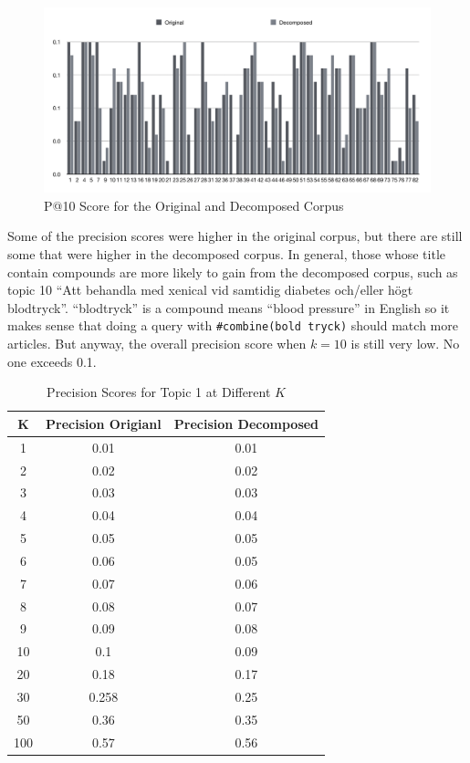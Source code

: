 \documentclass[11pt]{article} %
\begin{document}
\begin{figure}[h]
    \centering
    \includegraphics[width=1\textwidth]{p_at_10.png}
    \caption{P@10 Score for the Original and Decomposed Corpus}
\end{figure}

Some of the precision scores were higher in the original corpus, but there are still some that were higher in the decomposed corpus. In general, those whose title contain compounds are more likely to gain from the decomposed corpus, such as topic 10 ``Att behandla med xenical vid samtidig diabetes och/eller högt blodtryck''. ``blodtryck'' is a compound means ``blood pressure'' in English so it makes sense that doing a query with \verb|#combine(bold tryck)| should match more articles. But anyway, the overall precision score when $k=10$ is still very low. No one exceeds 0.1.

\begin{table}[h]
    \begin{center}
        \begin{tabular}{c|c|c|}
            \textbf{K} & \textbf{Precision Origianl} & \textbf{Precision Decomposed} \\
            \hline
            1  & 0.01 & 0.01 \\
            2  & 0.02 & 0.02 \\
            3  & 0.03 & 0.03 \\
            4  & 0.04 & 0.04 \\
            5  & 0.05 & 0.05 \\
            6  & 0.06 & 0.05 \\
            7  & 0.07 & 0.06 \\
            8  & 0.08 & 0.07 \\
            9  & 0.09 & 0.08 \\
            10  & 0.1 & 0.09 \\
            20  & 0.18 & 0.17 \\
            30  & 0.258 & 0.25 \\
            50  & 0.36 & 0.35 \\
            100  & 0.57 & 0.56 \\
        \end{tabular}
        \label{tab_k_value}
        \caption{Precision Scores for Topic 1 at Different $K$}
    \end{center}
\end{table}
\end{document}
